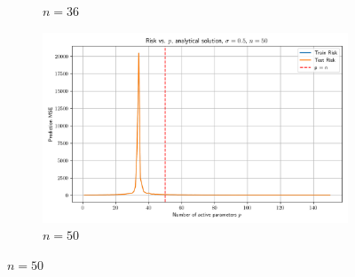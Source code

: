 \documentclass{article}
\begin{document}
\begin{figure}[htb]
\begin{subfigure}[b]{\imgwidth}
    \caption{$n=36$}\label{fig:2c}
  \end{subfigure}%
  \hfill
  \begin{subfigure}[b]{\imgwidth}
    \includegraphics[width=\linewidth]{img2/risk_curve_n50.png}
    \caption{$n=50$}\label{fig:2d}
  \end{subfigure}

  \medskip


\end{figure}
\end{document}
